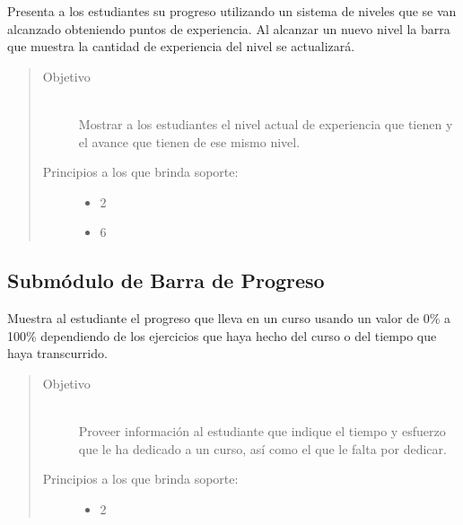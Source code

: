  Presenta a los estudiantes su progreso utilizando un sistema de niveles que se van alcanzado
 obteniendo puntos de experiencia. Al alcanzar un nuevo nivel la barra que muestra la
 cantidad de experiencia del nivel se actualizará.

    \begin{quote}
    \begin{description}
    \item[Objetivo] \hfill\\
        Mostrar a los estudiantes el nivel actual de experiencia que tienen y el avance que tienen de ese mismo nivel.


    \item[Principios a los que brinda soporte:] \hfill
        \begin{itemize}
            \item 2 \principioII
            \item 6 \principioVI
        \end{itemize}
    \end{description}
    \end{quote}


\subsection{Submódulo de Barra de Progreso}

Muestra al estudiante el progreso que lleva en un curso usando un valor de 0\% a 100\% dependiendo de los ejercicios que haya hecho del curso o del tiempo que haya transcurrido.

    \begin{quote}
    \begin{description}
        \item[Objetivo] \hfill\\
            Proveer información al estudiante que indique el tiempo y esfuerzo que le ha dedicado a un curso, así como el que le falta por dedicar.

        \item[Principios a los que brinda soporte:] \hfill
        \begin{itemize}
            \item 2 \principioII
        \end{itemize}
    \end{description}
    \end{quote}

